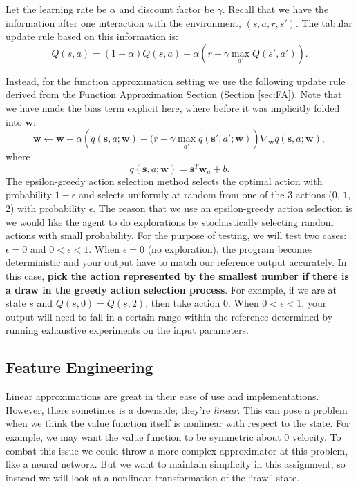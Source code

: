 \documentclass[11pt,addpoints,answers]{exam}
\newcommand{\sv}{\mathbf{s}}
\newcommand{\wv}{\mathbf{w}}
\begin{document}
Let the learning rate be $\alpha$ and discount factor be $\gamma$. Recall that we have the information after one interaction with the environment, $(s, a, r, s')$. The tabular update rule based on this information is: 
\[
    Q(s,a) = (1 - \alpha) Q(s, a) + \alpha \left(r + \gamma \max_{a'} Q(s', a')\right).
\]

Instead, for the function approximation setting we use the following update rule derived from the Function Approximation Section (Section \ref{sec:FA}). Note that we have made the bias term explicit here, where before it was implicitly folded into $\wv$:
\[
\wv \leftarrow \wv - \alpha \left(q(\sv, a; \wv) - (r + \gamma \max_{a'} q(\sv', a'; \wv)\right) \nabla_\wv q(\sv, a; \wv),
\]
where
\[
q(\sv,a;\wv) = \sv^T \wv_a + b.
\]
The epsilon-greedy action selection method selects the optimal action with probability $1 - \epsilon$ and selects uniformly at random from one of the 3 actions ($0$, $1$, $2$) with probability $\epsilon$. The reason that we use an epsilon-greedy action selection is we would like the agent to do explorations by stochastically selecting random actions with small probability. For the purpose of testing, we will test two cases: $\epsilon = 0$ and $0 < \epsilon < 1$. When $\epsilon = 0$ (no exploration), the program becomes deterministic and your output have to match our reference output accurately. In this case, \textbf{pick the action represented by the smallest number if there is a draw in the greedy action selection process}. For example, if we are at state $s$ and $Q(s, 0) = Q(s, 2)$, then take action $0$. When $0 < \epsilon < 1$, your output will need to fall in a certain range within the reference determined by running exhaustive experiments on the input parameters.


\subsection{Feature Engineering}
Linear approximations are great in their ease of use and implementations. However, there sometimes is a downside; they're \emph{linear}. This can pose a problem when we think the value function itself is nonlinear with respect to the state. For example, we may want the value function to be symmetric about 0 velocity. To combat this issue we could throw a more complex approximator at this problem, like a neural network. But we want to maintain simplicity in this assignment, so instead we will look at a nonlinear transformation of the ``raw'' state.
\end{document}
